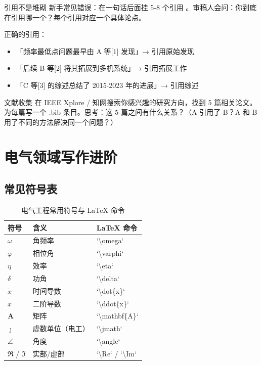 \documentclass[12pt,a4paper]{ctexart}
\begin{document}
\begin{writingtip}{引用不是堆砌}
    新手常见错误：在一句话后面挂 5-8 个引用 \cite{smith2023ml}。审稿人会问：你到底在引用哪一个？每个引用对应一个具体论点。

    正确的引用：
    \begin{itemize}
        \item 「频率最低点问题最早由 A 等[1] 发现」→ 引用原始发现
        \item 「后续 B 等[2] 将其拓展到多机系统」→ 引用拓展工作
        \item 「C 等[3] 的综述总结了 2015-2023 年的进展」→ 引用综述
    \end{itemize}
\end{writingtip}

\begin{exercise}{文献收集}
    在 IEEE Xplore / 知网搜索你感兴趣的研究方向，找到 5 篇相关论文。为每篇写一个 .bib 条目。思考：这 5 篇之间有什么关系？（A 引用了 B？A 和 B 用了不同的方法解决同一个问题？）
\end{exercise}


\section{电气领域写作进阶}

\subsection*{常见符号表}

\begin{table}[h]
\centering
\caption{电气工程常用符号与 LaTeX 命令}
\begin{tabular}{lll}
\toprule
\textbf{符号} & \textbf{含义} & \textbf{LaTeX 命令} \\
\midrule
$\omega$   & 角频率    & `\textbackslash omega` \\
$\varphi$  & 相位角    & `\textbackslash varphi` \\
$\eta$     & 效率      & `\textbackslash eta` \\
$\delta$   & 功角      & `\textbackslash delta` \\
$\dot{x}$  & 时间导数  & `\textbackslash dot\{x\}` \\
$\ddot{x}$ & 二阶导数  & `\textbackslash ddot\{x\}` \\
$\mathbf{A}$ & 矩阵    & `\textbackslash mathbf\{A\}` \\
$\jmath$   & 虚数单位（电工） & `\textbackslash jmath` \\
$\angle$   & 角度      & `\textbackslash angle` \\
$\Re$ / $\Im$ & 实部/虚部 & `\textbackslash Re` / `\textbackslash Im` \\
\bottomrule
\end{tabular}
\end{table}
\end{document}
